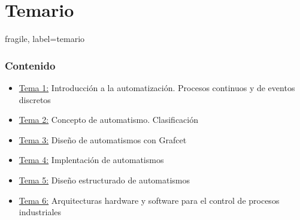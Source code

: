 \section{Temario}

\begin{frame}{fragile, label=temario}
\frametitle{Contenido}

{
\begin{itemize}[<+->]
    \item{\underline{Tema 1:} Introducción a la automatización. Procesos continuos y de eventos discretos}
    \item{\underline{Tema 2:} Concepto de automatismo. Clasificación}
    \item{\underline{Tema 3:} Diseño de automatismos con Grafcet}
    \item{\underline{Tema 4:} Implentación de automatismos}
    \item{\underline{Tema 5:} Diseño estructurado de automatismos}
    \item{\underline{Tema 6:} Arquitecturas hardware y software para el control de procesos industriales}
    
\end{itemize}}

\end{frame}
